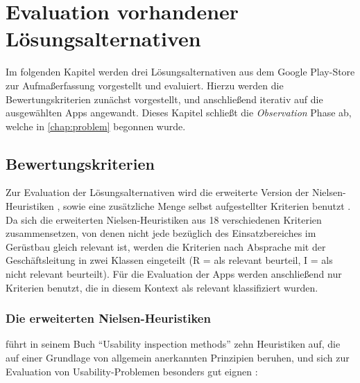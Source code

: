 \chapter{Evaluation vorhandener Lösungsalternativen}\label{chap:eval}
Im folgenden Kapitel werden drei Lösungsalternativen aus dem Google Play-Store zur Aufmaßerfassung vorgestellt und evaluiert.
Hierzu werden die Bewertungskriterien zunächst vorgestellt, und anschließend iterativ auf die ausgewählten Apps angewandt.
Dieses Kapitel schließt die \emph{Observation} Phase ab, welche in \autoref{chap:problem} begonnen wurde. 

\section{Bewertungskriterien}
Zur Evaluation der Lösungsalternativen wird die erweiterte Version der Nielsen-Heuristiken \citep{Nielsen94}, sowie eine zusätzliche Menge selbst aufgestellter Kriterien benutzt .
Da sich die erweiterten Nielsen-Heuristiken aus 18 verschiedenen Kriterien zusammensetzen, von denen nicht jede bezüglich des Einsatzbereiches im Gerüstbau gleich relevant ist, werden die Kriterien nach Absprache mit der Geschäftsleitung in zwei Klassen eingeteilt (R = als relevant beurteil, I = als nicht relevant beurteilt).
Für die Evaluation der Apps werden anschließend nur Kriterien benutzt, die in diesem Kontext als relevant klassifiziert wurden.

\subsection{Die erweiterten Nielsen-Heuristiken}\label{subsec:nielsen}
\citeauthor{Nielsen94} führt in seinem Buch ``Usability inspection methods'' zehn Heuristiken auf, die auf einer Grundlage von allgemein anerkannten Prinzipien beruhen, und sich zur Evaluation von Usability-Problemen besonders gut eignen \citep[Seiten 25--62]{Nielsen94}: 

\begin{enumerate}
\end{enumerate} 

